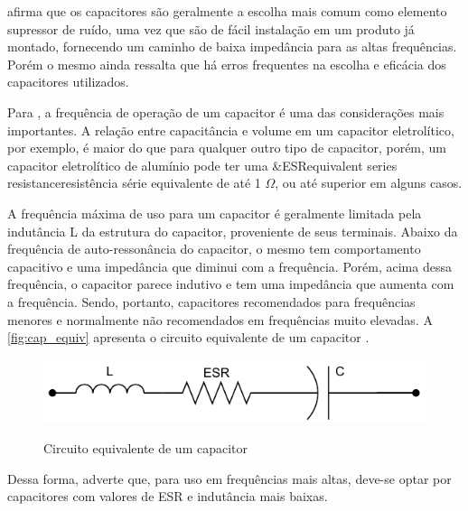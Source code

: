              afirma que os capacitores são geralmente a escolha mais comum como elemento supressor de ruído, uma vez que são de fácil instalação em um produto já montado, fornecendo um caminho de baixa impedância para as altas frequências. Porém o mesmo ainda ressalta que há erros frequentes na escolha e eficácia dos capacitores utilizados. 
            
            Para , a frequência de operação de um capacitor é uma das considerações mais importantes. A relação entre capacitância e volume em um capacitor eletrolítico, por exemplo, é maior do que para qualquer outro tipo de capacitor, porém, um capacitor eletrolítico de alumínio pode ter uma \abreviatura&{ESR}{equivalent series resistance}{resistência série equivalente} de até 1 $\Omega$, ou até superior em alguns casos.
            
            A frequência máxima de uso para um capacitor é geralmente limitada pela indutância L da estrutura do capacitor, proveniente de seus terminais. Abaixo da frequência de auto-ressonância do capacitor, o mesmo tem comportamento capacitivo e uma impedância que diminui com a frequência. Porém, acima dessa frequência, o capacitor parece indutivo e tem uma impedância que aumenta com a frequência. Sendo, portanto, capacitores recomendados para frequências menores e normalmente não recomendados em frequências muito elevadas. A \autoref{fig:cap_equiv} apresenta o circuito equivalente de um capacitor \cite{ref:EMC_livro_NoiseReduct}. 
            
            \begin{figure}[H]
            	\centering
            	\caption{Circuito equivalente de um capacitor}
            	\includegraphics[scale=.8]{pdf/outros/cap_equiv3.pdf}
            	\label{fig:cap_equiv}
            \end{figure}
            
            Dessa forma,  adverte que, para uso em frequências mais altas, deve-se optar por capacitores com valores de ESR e indutância mais baixas.
            
